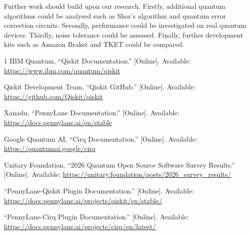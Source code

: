 \documentclass[journal]{IEEEtran}
\begin{document}
Further work should build upon our research. Firstly, additional quantum algorithms could be analysed such as Shor's algorithm and quantum error correction circuits. Secondly, performance could be investigated on real quantum devices. Thirdly, noise tolerance could be assessed. Finally, further development kits such as Amazon Braket and TKET could be compared.

\nocite{*}
\begin{thebibliography}{1}
IBM Quantum, ``Qiskit Documentation.'' [Online]. Available: \url{https://www.ibm.com/quantum/qiskit}

Qiskit Development Team, ``Qiskit GitHub.'' [Online]. Available: \url{https://github.com/Qiskit/qiskit}

Xanadu, ``PennyLane Documentation.'' [Online]. Available: \url{https://docs.pennylane.ai/en/stable}

Google Quantum AI, ``Cirq Documentation.'' [Online]. Available: \url{https://quantumai.google/cirq}

Unitary Foundation, ``2026 Quantum Open Source Software Survey Results.'' [Online]. Available: \url{https://unitary.foundation/posts/2026_survey_results/}

``PennyLane-Qiskit Plugin Documentation.'' [Online]. Available: \url{https://docs.pennylane.ai/projects/qiskit/en/stable/}

``PennyLane-Cirq Plugin Documentation.'' [Online]. Available: \url{https://docs.pennylane.ai/projects/cirq/en/latest/}
\end{thebibliography}
\end{document}
